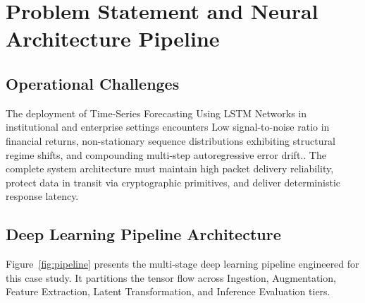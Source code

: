 \section{Problem Statement and Neural Architecture Pipeline}

\subsection{Operational Challenges}
The deployment of Time-Series Forecasting Using LSTM Networks in institutional and enterprise settings encounters Low signal-to-noise ratio in financial returns, non-stationary sequence distributions exhibiting structural regime shifts, and compounding multi-step autoregressive error drift.. The complete system architecture must maintain high packet delivery reliability, protect data in transit via cryptographic primitives, and deliver deterministic response latency.

\subsection{Deep Learning Pipeline Architecture}
Figure~\ref{fig:pipeline} presents the multi-stage deep learning pipeline engineered for this case study. It partitions the tensor flow across Ingestion, Augmentation, Feature Extraction, Latent Transformation, and Inference Evaluation tiers.

